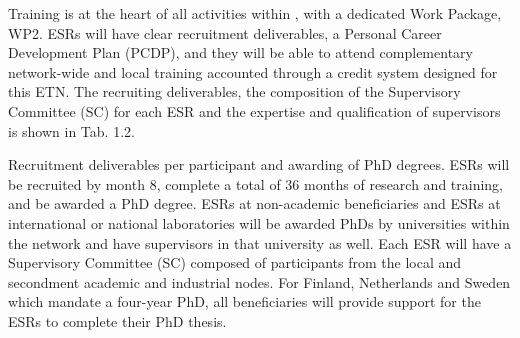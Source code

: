 Training is at the heart of all activities within \acronym, with a dedicated Work Package, WP2. ESRs will have clear recruitment deliverables, a Personal Career Development Plan (PCDP), and they will be able to attend complementary network-wide and local training accounted through a credit system designed for this ETN. The recruiting deliverables, the composition of the Supervisory Committee (SC) for each ESR and the expertise and qualification of supervisors is shown in Tab. 1.2.



\noindent \color{blue}Recruitment deliverables per participant and awarding of PhD degrees. \color{black}
ESRs will be recruited by month 8, complete a total of 36 months of research and training, and be awarded a PhD degree. 
ESRs at non-academic beneficiaries and ESRs at international or national laboratories will be awarded PhDs by universities within the network and have supervisors in that university as well. 
Each ESR will have a Supervisory Committee (SC) composed of participants from the local and secondment academic and industrial nodes. 
For Finland, Netherlands and Sweden which mandate a four-year PhD, all beneficiaries will provide support for the ESRs to complete their PhD thesis.

